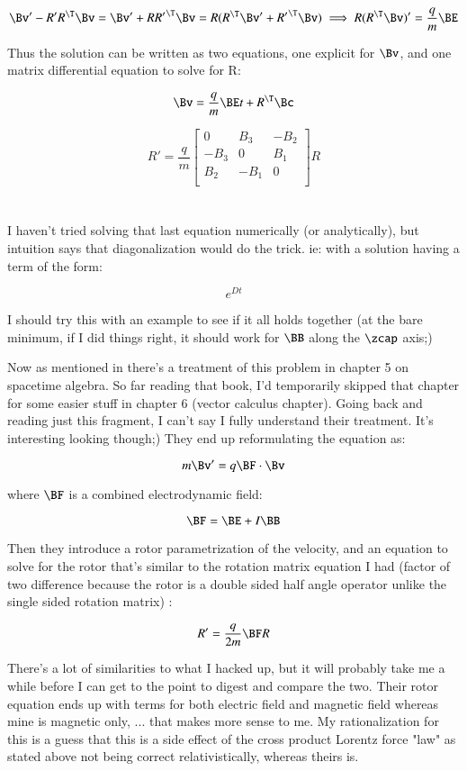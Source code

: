 \[
\Bv' - R' R^\T \Bv = \Bv' + R {R'}^\T \Bv = R (R^\T \Bv' + {R'}^\T \Bv) 
\implies 
R (R^\T \Bv)' = \frac{q}{m} \BE
\]

Thus the solution can be written as two equations, one explicit for $\Bv$, and one matrix differential equation to solve for R:

\[
\Bv = \frac{q}{m} \BE t + R^\T \Bc
\]

\[
R' = \frac{q}{m}
\begin{bmatrix}
0 & B_3 & -B_2 \\
-B_3 & 0 & B_1 \\
B_2 & -B_1 & 0 \\
\end{bmatrix}
R
\]

\section{}

I haven't tried solving that last equation numerically (or analytically), but intuition says that diagonalization would do the trick.  ie: with a solution having a term of the form:

\[
e^{Dt}
\]

I should try this with an example to see if it all holds together (at the bare minimum, if I did things right, it should work for $\BB$ along the $\zcap$ axis;)

Now as mentioned in \cite{doran2003gap}
there's a treatment of this problem 
in chapter 5 on spacetime algebra.  So far reading that book, I'd temporarily skipped that chapter for some easier stuff in chapter 6 (vector calculus chapter).  Going back and reading just this fragment, I can't say I fully understand their treatment.  It's interesting looking though;)  They end up reformulating the equation as:

\[
m \Bv' = q \BF \cdot \Bv
\]

where $\BF$ is a combined electrodynamic field:

\[
\BF = \BE + I \BB
\]

Then they introduce a rotor parametrization of the velocity, and an equation to solve for the rotor that's similar to the rotation matrix equation I had (factor of two difference because the rotor is a double sided half angle operator unlike the single sided rotation matrix) :

\[
R' = \frac{q}{2m} \BF R
\]

There's a lot of similarities to what I hacked up, but it will probably take me a while before I can get to the point to digest and compare the two.   Their rotor equation ends up with terms for both electric field and magnetic field whereas mine is magnetic only, ... that makes more sense to me.  My rationalization for this is a guess that this is a side effect of the cross product Lorentz force "law" as stated above not being correct relativistically, whereas theirs is.
